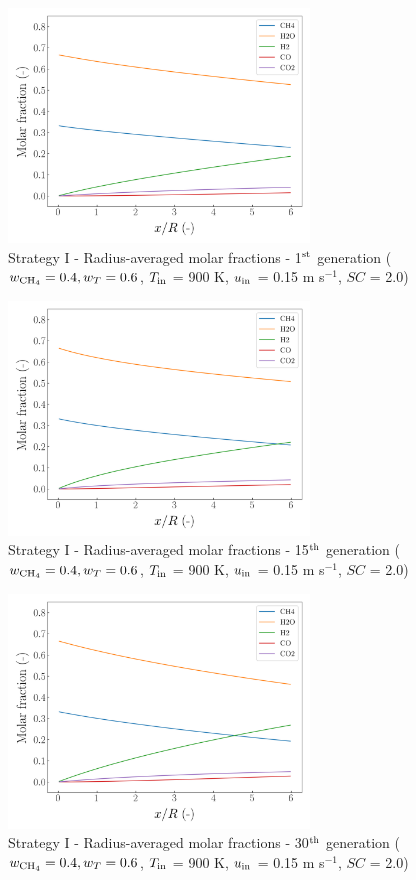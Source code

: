 \documentclass[preprint,12pt]{elsarticle}
\begin{document}
\begin{figure}[h!]
\centering
\includegraphics[width=80mm]{results/5/40C_60T/GEN1-AVG.png}
\caption{\label{fig:5R4060G1-avg} Strategy I - Radius-averaged molar fractions - 1$^{\rm{st}}$ generation ($w_{\rm{CH_4}} = 0.4, w_T = 0.6$, $T_{\rm{in}}$ = 900 K, $u_{\rm{in}}$ = 0.15 m s$^{-1}$, $SC$ = 2.0)}
\end{figure}

\begin{figure}[h!]
\centering
\includegraphics[width=80mm]{results/5/40C_60T/GEN15-AVG.png}
\caption{\label{fig:5R4060G15-avg} Strategy I - Radius-averaged molar fractions - 15$^{\rm{th}}$ generation ($w_{\rm{CH_4}} = 0.4, w_T = 0.6$, $T_{\rm{in}}$ = 900 K, $u_{\rm{in}}$ = 0.15 m s$^{-1}$, $SC$ = 2.0)}
\end{figure}

\begin{figure}[h!]
\centering
\includegraphics[width=80mm]{results/5/40C_60T/GEN30-AVG.png}
\caption{\label{fig:5R4060G30-avg} Strategy I - Radius-averaged molar fractions -  30$^{\rm{th}}$ generation ($w_{\rm{CH_4}} = 0.4, w_T = 0.6$, $T_{\rm{in}}$ = 900 K, $u_{\rm{in}}$ = 0.15 m s$^{-1}$, $SC$ = 2.0)}
\end{figure}
\end{document}
